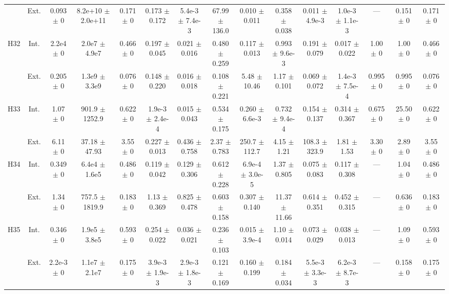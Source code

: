 \begin{table}[htbp]
{\begin{tabular}{@{}ccccccccccccccc@{}}
 & Ext. & 0.093 $\pm$ 0 & 8.2e+10 $\pm$ 2.0e+11 & 0.171 $\pm$ 0 & 0.173 $\pm$ 0.172 & 5.4e-3 $\pm$ 7.4e-3 & 67.99 $\pm$ 136.0 & 0.010 $\pm$ 0.011 & 0.358 $\pm$ 0.038 & 0.011 $\pm$ 4.9e-3 & 1.0e-3 $\pm$ 1.1e-3 & --- & 0.151 $\pm$ 0 & 0.171 $\pm$ 0 \\
\cline{2-15}
\multirow{2}{*}{H32} & Int. & 2.2e4 $\pm$ 0 & 2.0e7 $\pm$ 4.9e7 & 0.466 $\pm$ 0 & 0.197 $\pm$ 0.045 & 0.021 $\pm$ 0.016 & 0.480 $\pm$ 0.259 & 0.117 $\pm$ 0.013 & 0.993 $\pm$ 9.6e-3 & 0.191 $\pm$ 0.079 & 0.017 $\pm$ 0.022 & 1.00 $\pm$ 0 & 1.00 $\pm$ 0 & 0.466 $\pm$ 0 \\
 & Ext. & 0.205 $\pm$ 0 & 1.3e9 $\pm$ 3.3e9 & 0.076 $\pm$ 0 & 0.148 $\pm$ 0.220 & 0.016 $\pm$ 0.018 & 0.108 $\pm$ 0.221 & 5.48 $\pm$ 10.46 & 1.17 $\pm$ 0.101 & 0.069 $\pm$ 0.072 & 1.4e-3 $\pm$ 7.5e-4 & 0.995 $\pm$ 0 & 0.995 $\pm$ 0 & 0.076 $\pm$ 0 \\
\cline{2-15}
\multirow{2}{*}{H33} & Int. & 1.07 $\pm$ 0 & 901.9 $\pm$ 1252.9 & 0.622 $\pm$ 0 & 1.9e-3 $\pm$ 2.4e-4 & 0.015 $\pm$ 0.043 & 0.534 $\pm$ 0.175 & 0.260 $\pm$ 6.6e-3 & 0.732 $\pm$ 9.4e-4 & 0.154 $\pm$ 0.137 & 0.314 $\pm$ 0.367 & 0.675 $\pm$ 0 & 25.50 $\pm$ 0 & 0.622 $\pm$ 0 \\
 & Ext. & 6.11 $\pm$ 0 & 37.18 $\pm$ 47.93 & 3.55 $\pm$ 0 & 0.227 $\pm$ 0.013 & 0.436 $\pm$ 0.758 & 2.37 $\pm$ 0.783 & 250.7 $\pm$ 112.7 & 4.15 $\pm$ 1.21 & 108.3 $\pm$ 323.9 & 1.81 $\pm$ 1.53 & 3.30 $\pm$ 0 & 2.89 $\pm$ 0 & 3.55 $\pm$ 0 \\
\cline{2-15}
\multirow{2}{*}{H34} & Int. & 0.349 $\pm$ 0 & 6.4e4 $\pm$ 1.6e5 & 0.486 $\pm$ 0 & 0.119 $\pm$ 0.042 & 0.129 $\pm$ 0.306 & 0.612 $\pm$ 0.228 & 6.9e-4 $\pm$ 3.0e-5 & 1.37 $\pm$ 0.805 & 0.075 $\pm$ 0.083 & 0.117 $\pm$ 0.308 & --- & 1.04 $\pm$ 0 & 0.486 $\pm$ 0 \\
 & Ext. & 1.34 $\pm$ 0 & 757.5 $\pm$ 1819.9 & 0.183 $\pm$ 0 & 1.13 $\pm$ 0.369 & 0.825 $\pm$ 0.478 & 0.603 $\pm$ 0.158 & 0.307 $\pm$ 0.140 & 11.37 $\pm$ 11.66 & 0.614 $\pm$ 0.351 & 0.452 $\pm$ 0.315 & --- & 0.636 $\pm$ 0 & 0.183 $\pm$ 0 \\
\cline{2-15}
\multirow{2}{*}{H35} & Int. & 0.346 $\pm$ 0 & 1.9e5 $\pm$ 3.8e5 & 0.593 $\pm$ 0 & 0.254 $\pm$ 0.022 & 0.036 $\pm$ 0.021 & 0.236 $\pm$ 0.103 & 0.015 $\pm$ 3.9e-4 & 1.10 $\pm$ 0.014 & 0.073 $\pm$ 0.029 & 0.038 $\pm$ 0.013 & --- & 1.09 $\pm$ 0 & 0.593 $\pm$ 0 \\
 & Ext. & 2.2e-3 $\pm$ 0 & 1.1e7 $\pm$ 2.1e7 & 0.175 $\pm$ 0 & 3.9e-3 $\pm$ 1.9e-3 & 2.9e-3 $\pm$ 1.8e-3 & 0.121 $\pm$ 0.169 & 0.160 $\pm$ 0.199 & 0.184 $\pm$ 0.034 & 5.5e-3 $\pm$ 3.3e-3 & 6.2e-3 $\pm$ 8.7e-3 & --- & 0.158 $\pm$ 0 & 0.175 $\pm$ 0 \\

\end{tabular}}
\end{table}
